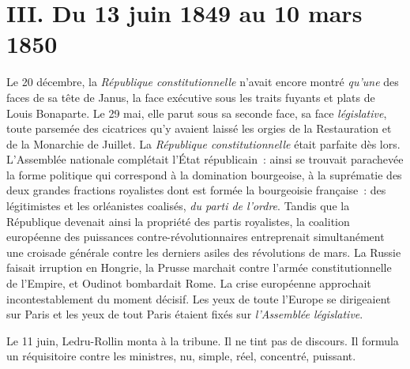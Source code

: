 \documentclass[french,twoside]{book} %
\newcommand\chaptercont{} %
\begin{document}
\chapter[{III. Du 13 juin 1849 au 10 mars 1850}]{III. Du 13 juin 1849 au 10 mars 1850}
\renewcommand{\leftmark}{III. Du 13 juin 1849 au 10 mars 1850}


\chaptercont
\noindent Le 20 décembre, la \emph{République constitutionnelle} n’avait encore montré \emph{qu’une} des faces de sa tête de Janus, la face exécutive sous les traits fuyants et plats de Louis Bonaparte. Le 29 mai, elle parut sous sa seconde face, sa face \emph{législative}, toute parsemée des cicatrices qu’y avaient laissé les orgies de la Restauration et de la Monarchie de Juillet. La \emph{République constitutionnelle} était parfaite dès lors. L’Assemblée nationale complétait l’État républicain : ainsi se trouvait parachevée la forme politique qui correspond à la domination bourgeoise, à la suprématie des deux grandes fractions royalistes dont est formée la bourgeoisie française : des légitimistes et les orléanistes coalisés, \emph{du parti de l’ordre}. Tandis que la République devenait ainsi la propriété des partis royalistes, la coalition européenne des puissances contre-révolutionnaires entreprenait simultanément une croisade générale contre les derniers asiles des révolutions de mars. La Russie faisait irruption en Hongrie, la Prusse marchait contre l’armée constitutionnelle de l’Empire, et Oudinot bombardait Rome. La crise européenne approchait incontestablement du moment décisif. Les yeux de toute l’Europe se dirigeaient sur Paris et les yeux de tout Paris étaient fixés sur \emph{l’Assemblée législative}.\par
Le 11 juin, Ledru-Rollin monta à la tribune. Il ne tint pas de discours. Il formula un réquisitoire contre les ministres, nu, simple, réel, concentré, puissant.\par
\end{document}
